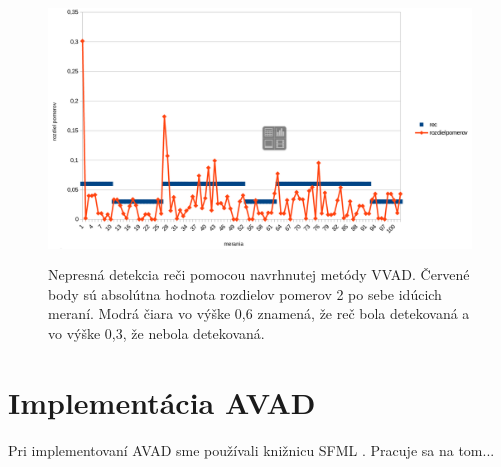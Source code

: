 \begin{figure}[H]
	\begin{center}
		\includegraphics[height=7cm]{pics/nespravneRozpoznanie.png}
		\caption{Nepresná detekcia reči pomocou navrhnutej metódy VVAD.
		Červené body sú absolútna hodnota rozdielov pomerov 2 po sebe idúcich meraní. 
		Modrá čiara vo výške 0,6 znamená, že reč bola detekovaná a vo výške 0,3, že nebola detekovaná.}
		\label{pic-nespravneRozpoznanie}
	\end{center}
\end{figure}

\section{Implementácia AVAD}
Pri implementovaní AVAD sme používali knižnicu SFML \cite{SFML}.
Pracuje sa na tom...